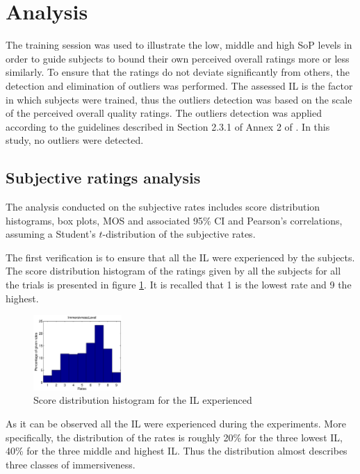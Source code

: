 \section{Analysis}
The training session was used to illustrate the low, middle and high \ac{SoP} levels in order to guide subjects to bound their own perceived overall ratings more or less similarly.
To ensure that the ratings do not deviate significantly from others, the detection and elimination of outliers was performed.
The assessed \ac{IL} is the factor in which subjects were trained, thus the outliers detection was based on the scale of the perceived overall quality ratings. The outliers detection was applied according to the guidelines described in Section 2.3.1 of Annex 2 of \cite{Outliers}. In this study, no outliers were detected.

\subsection{Subjective ratings analysis}

The analysis conducted on the subjective rates includes score distribution histograms, box plots, \acf{MOS} and associated 95\% \acf{CI} and Pearson's correlations, assuming a Student's $t$-distribution of the subjective rates. 

The first verification is to ensure that all the \acf{IL} were experienced by the subjects. The score distribution histogram of the ratings given by all the subjects for all the trials is presented in figure \ref{Hist}. It is recalled that 1 is the lowest rate and 9 the highest.

\begin{figure}[!ht]
    \center
    \includegraphics[width=0.3\textwidth]{./images/Hist9ImmersivnessLevel.png}
    \caption{Score distribution histogram for the \ac{IL} experienced }
    \label{Hist}
\end{figure}

As it can be observed all the \ac{IL} were experienced during the experiments. More specifically, the distribution of the rates is roughly 20\% for the three lowest \ac{IL}, 40\% for the three middle and highest \ac{IL}. Thus the distribution almost describes three classes of immersiveness.  

